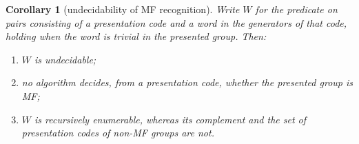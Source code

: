 \documentclass[11pt]{amsart}
\newcommand{\leanverified}[2]{\ignorespaces}
\newtheorem{corollary}[theorem]{Corollary}
\theoremstyle{definition}
\theoremstyle{remark}
\theoremstyle{plain}
\begin{document}
\begin{corollary}[undecidability of MF recognition]%
\label{cor:undecidable}
Write $W$ for the predicate on pairs consisting of a presentation code
and a word in the generators of that code, holding when the word is
trivial in the presented group.  Then:
\begin{enumerate}
\item $W$ is undecidable;
\item no algorithm decides, from a presentation code, whether the
presented group is MF;
\item $W$ is recursively enumerable, whereas its complement and the
set of presentation codes of non-MF groups are not.
\end{enumerate}
\end{corollary}
\leanverified{Computability/BooneWordProblemUndecidable}{GroupApproximation.Computability.not_computablePred_wordProblemPred}
\leanverified{Computability/BooneWordProblemUndecidable}{GroupApproximation.Computability.operatorMF_recognition_not_computable}
\leanverified{Computability/WordProblemRE}{GroupApproximation.WordProblemRE.rePred_wordProblemPred}
\leanverified{Computability/WordProblemRE}{GroupApproximation.WordProblemRE.operatorMF_negative_side_not_re}
\leanverified{Computability/AdianRabinVariantTransform}{GroupApproximation.AdianRabinVariantTransform.operatorMF_recognition_undecidable_of_wordProblem}
\leanverified{Computability/AdianRabinVariantTransform}{GroupApproximation.AdianRabinVariantTransform.operatorMF_negative_side_not_re_of_wordProblem}
\end{document}
